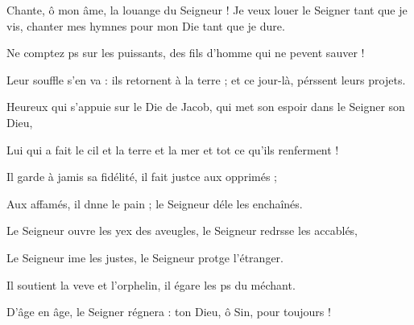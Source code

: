 \item Chante, ô mon âme, la louange du Seigneur !\pscross{} Je veux louer le Seigner tant que je vis,\psstar{} chanter mes hymnes pour mon Die tant que je dure.
\item Ne comptez ps sur les puissants,\psstar{} des fils d’homme qui ne pevent sauver !
\item Leur souffle s’en va : ils retornent à la terre ;\psstar{} et ce jour-là, pérssent leurs projets.
\item Heureux qui s’appuie sur le Die de Jacob,\psstar{} qui met son espoir dans le Seigner son Dieu,
\item Lui qui a fait le cil et la terre\psstar{} et la mer et tot ce qu’ils renferment ! 
\item Il garde à jamis sa fidélité,\psstar{} il fait justce aux opprimés ; 
\item Aux affamés, il dnne le pain ;\psstar{} le Seigneur déle les enchaînés.
\item Le Seigneur ouvre les yex des aveugles,\psstar{} le Seigneur redrsse les accablés, 
\item Le Seigneur ime les justes,\psstar{} le Seigneur protge l’étranger. 
\item Il soutient la veve et l’orphelin,\psstar{} il égare les ps du méchant.
\item D’âge en âge, le Seigner régnera :\psstar{} ton Dieu, ô Sin, pour toujours !